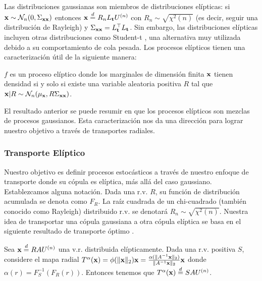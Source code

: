 Las distribuciones gaussianas son miembros de distribuciones elípticas: si \(\mathbf{x} \sim \mathcal{N}_{n}(0,\Sigma_{\mathbf{x}\mathbf{x}})\) entonces \(\mathbf{x} \stackrel{d}{=} R_{n}L_{ \mathbf{t}}U^{(n)}\) con \(R_{n} \sim \sqrt{\chi^{2}(n)}\) (es decir, seguir una distribución de Rayleigh) y \(\Sigma_{\mathbf{x}\mathbf{x}} =L_{\mathbf{t}}^\top L_{\mathbf{t}}\). Sin embargo, las distribuciones elípticas incluyen otras distribuciones como Student-t \cite{demarta2005t}, una alternativa muy utilizada debido a su comportamiento de cola pesada. Los procesos elípticos tienen una caracterización útil de la siguiente manera:
\begin{theorem}
	\(f\) es un proceso elíptico donde los marginales de dimensión finita \(\mathbf{x}\) tienen densidad si y solo si existe una variable aleatoria positiva \(R\) tal que \(\mathbf{x}|R \sim \mathcal{N}_{n}(\mu_{ \mathbf{x}},R\Sigma_{\mathbf{x}\mathbf{x}})\).
\end{theorem}
El resultado anterior se puede resumir en que los procesos elípticos son mezclas de procesos gaussianos. Esta caracterización nos da una dirección para lograr nuestro objetivo a través de transportes radiales.

\subsubsection{Transporte Elíptico}

Nuestro objetivo es definir procesos estocásticos a través de nuestro enfoque de transporte donde su cópula es elíptica, más allá del caso gaussiano. Establezcamos alguna notación. Dada una r.v. \(R\), su función de distribución acumulada se denota como \(F_R\). La raíz cuadrada de un chi-cuadrado (también conocido como Rayleigh) distribuido r.v. se denotará \(R_{n} \sim \sqrt{\chi^{2}(n)}\). Nuestra idea de transportar una cópula gaussiana a otra cópula elíptica se basa en el siguiente resultado de transporte óptimo \cite{cuestaalbertos1993optimal, ghaffari2018multivariate}.

\begin{proposition}
	Sea \(\mathbf{x} \stackrel{d}{=} RAU^{(n)}\) una v.r. distribuida elípticamente. Dada una r.v. positiva \(S\), considere el mapa radial \(T^\alpha(\mathbf{x}) = \phi(\lVert \mathbf{x} \rVert_2)\mathbf{x} = \frac{\alpha(\lVert A^{-1}\mathbf{x} \rVert_2)}{\lVert A^{-1}\mathbf{x} \rVert_2}\mathbf{x}\) donde \(\alpha(r) = F_{S}^{-1}(F_R(r))\). Entonces tenemos que \(T^\alpha(\mathbf{x}) \stackrel{d}{=} SAU^{(n)}\).
\end{proposition}

